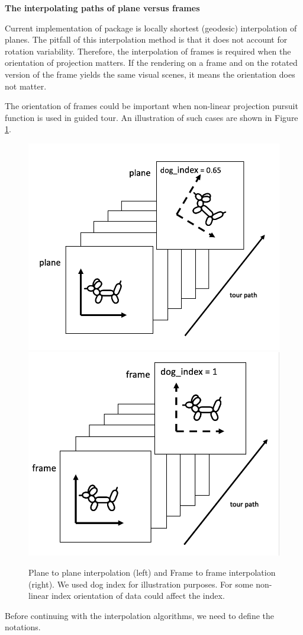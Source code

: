 \textbf{The interpolating paths of plane versus frames}

Current implementation of  package is locally shortest
(geodesic) interpolation of planes. The pitfall of this interpolation
method is that it does not account for rotation variability. Therefore,
the interpolation of frames is required when the orientation of
projection matters. If the rendering on a frame and on the rotated
version of the frame yields the same visual scenes, it means the
orientation does not matter.

The orientation of frames could be important when non-linear projection
pursuit function is used in guided tour. An illustration of such cases
are shown in Figure \ref{fig:dogs}.

\begin{Schunk}
\begin{figure}

{\centering \includegraphics[width=0.45\linewidth]{plane} \includegraphics[width=0.45\linewidth]{frame} 

}

\caption[Plane to plane interpolation (left) and Frame to frame interpolation (right)]{Plane to plane interpolation (left) and Frame to frame interpolation (right). We used dog index for illustration purposes. For some non-linear index orientation of data could affect the index.}\label{fig:dogs}
\end{figure}
\end{Schunk}

Before continuing with the interpolation algorithms, we need to define
the notations.

